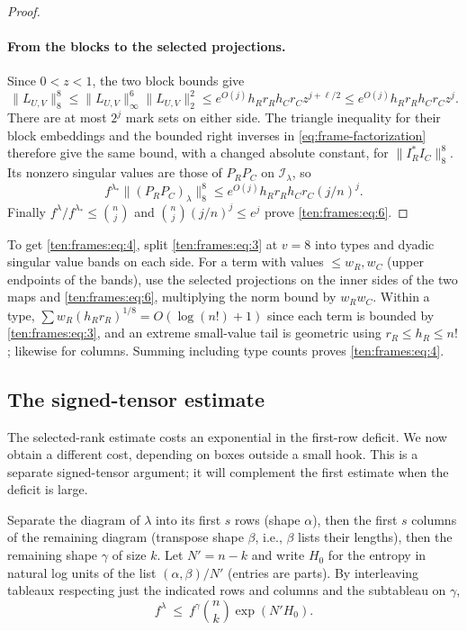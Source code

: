 \begin{proof}
\paragraph{From the blocks to the selected projections.}
Since $0<z<1$, the two block bounds give
\[
 \|L_{U,V}\|_8^8
 \le\|L_{U,V}\|_\infty^6\|L_{U,V}\|_2^2
 \le e^{O(j)}h_Rr_Rh_Cr_C z^{j+\ell/2}
 \le e^{O(j)}h_Rr_Rh_Cr_C z^j.
\]
There are at most $2^j$ mark sets on either side. The triangle inequality for their block embeddings and the bounded right inverses in \eqref{eq:frame-factorization} therefore give the same bound, with a changed absolute constant, for $\|I_R^*I_C\|_8^8$. Its nonzero singular values are those of $P_RP_C$ on $\mathcal I_\lambda$, so
\[
 f^{\lambda_*}\|(P_RP_C)_\lambda\|_8^8
 \le e^{O(j)}h_Rr_Rh_Cr_C(j/n)^j.
\]
Finally $f^\lambda/f^{\lambda_*}\le\binom nj$ and
$\binom nj(j/n)^j\le e^j$ prove \eqref{ten:frames:eq:6}.
\end{proof}

To get \eqref{ten:frames:eq:4}, split \eqref{ten:frames:eq:3} at \(v=8\) into types and dyadic singular value bands on each side. For a term with values \(\le w_R,w_C\) (upper endpoints of the bands), use the selected projections on the inner sides of the two maps and \eqref{ten:frames:eq:6}, multiplying the norm bound by \(w_R w_C\). Within a type, \(\sum w_R(h_R r_R)^{1/8}=O(\log(n!)+1)\) since each term is bounded by \eqref{ten:frames:eq:3}, and an extreme small-value tail is geometric using \(r_R\le h_R\le n!\); likewise for columns. Summing including type counts proves \eqref{ten:frames:eq:4}.

\subsection{The signed-tensor estimate}
\label{ten:frames:part:113}
The selected-rank estimate costs an exponential in the first-row deficit. We now obtain a different cost, depending on boxes outside a small hook. This is a separate signed-tensor argument; it will complement the first estimate when the deficit is large.

Separate the diagram of \(\lambda\) into its first \(s\) rows (shape \(\alpha\)), then the first \(s\) columns of the remaining diagram (transpose shape \(\beta\), i.e., \(\beta\) lists their lengths), then the remaining shape \(\gamma\) of size \(k\). Let \(N'=n-k\) and write \(H_0\) for the entropy in natural log units of the list \((\alpha,\beta)/N'\) (entries are parts). By interleaving tableaux respecting just the indicated rows and columns and the subtableau on \(\gamma\),
\begin{equation}
 f^\lambda\ \le\ f^\gamma \binom nk \exp(N'H_0).
 \label{ten:frames:eq:11}
\end{equation}

